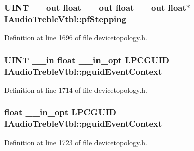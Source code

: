 \subsubsection[{\texorpdfstring{pf\+Stepping}{pfStepping}}]{ {\bf U\+I\+NT} {\bf \+\_\+\+\_\+out} float {\bf \+\_\+\+\_\+out} float {\bf \+\_\+\+\_\+out} float$\ast$ I\+Audio\+Treble\+Vtbl\+::pf\+Stepping}\hypertarget{struct_i_audio_treble_vtbl_af14f1a55adc1067922d213b3e997d94f}{}\label{struct_i_audio_treble_vtbl_af14f1a55adc1067922d213b3e997d94f}


Definition at line 1696 of file devicetopology.\+h.

\subsubsection[{\texorpdfstring{pguid\+Event\+Context}{pguidEventContext}}]{ {\bf U\+I\+NT} {\bf \+\_\+\+\_\+in} float {\bf \+\_\+\+\_\+in\+\_\+opt} {\bf L\+P\+C\+G\+U\+ID} I\+Audio\+Treble\+Vtbl\+::pguid\+Event\+Context}\hypertarget{struct_i_audio_treble_vtbl_a61d4ce5f7b837f37a307f741e3acca9a}{}\label{struct_i_audio_treble_vtbl_a61d4ce5f7b837f37a307f741e3acca9a}


Definition at line 1714 of file devicetopology.\+h.

\subsubsection[{\texorpdfstring{pguid\+Event\+Context}{pguidEventContext}}]{ float {\bf \+\_\+\+\_\+in\+\_\+opt} {\bf L\+P\+C\+G\+U\+ID} I\+Audio\+Treble\+Vtbl\+::pguid\+Event\+Context}\hypertarget{struct_i_audio_treble_vtbl_ad136887496d9cb7a5e2654bc70980255}{}\label{struct_i_audio_treble_vtbl_ad136887496d9cb7a5e2654bc70980255}


Definition at line 1723 of file devicetopology.\+h.

